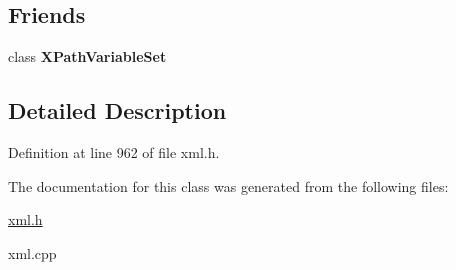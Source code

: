 \subsection*{Friends}
\begin{DoxyCompactItemize}
\item 
\hypertarget{classphys_1_1xml_1_1XPathVariable_a6d8e28205e67fa0164160dd3cb547fe6}{
class {\bfseries XPathVariableSet}}
\label{df/dee/classphys_1_1xml_1_1XPathVariable_a6d8e28205e67fa0164160dd3cb547fe6}

\end{DoxyCompactItemize}


\subsection{Detailed Description}


Definition at line 962 of file xml.h.



The documentation for this class was generated from the following files:\begin{DoxyCompactItemize}
\item 
\hyperlink{xml_8h}{xml.h}\item 
xml.cpp\end{DoxyCompactItemize}
